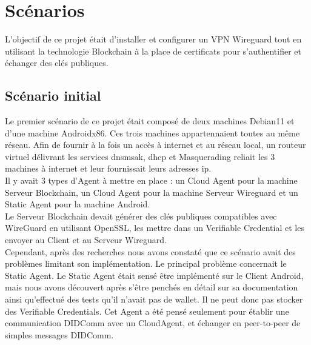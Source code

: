 \documentclass[12pt, openany]{report}
\begin{document}
\section{Scénarios}
L'objectif de ce projet était d'installer et configurer un VPN Wireguard tout en utilisant la technologie Blockchain à la place de certificats pour s'authentifier et échanger des clés publiques. 

\subsection{Scénario initial}
\noindent 
\begin{flushleft}
Le premier scénario de ce projet était composé de deux machines Debian11 et d'une machine Androidx86. Ces trois machines appartennaient toutes au même réseau. Afin de fournir à la fois un accès à internet et au réseau local, un routeur virtuel délivrant les services dnsmsak, dhcp et Masquerading reliait les 3 machines à internet et leur fournissait leurs adresses ip.\\
\vspace{2mm}
Il y avait 3 types d'Agent à mettre en place : un Cloud Agent pour la machine Serveur Blockchain, un Cloud Agent pour la machine Serveur Wireguard et un Static Agent pour la machine Android. \\
Le Serveur Blockchain devait générer des clés publiques compatibles avec WireGuard en utilisant OpenSSL, les mettre dans un Verifiable Credential et les envoyer au Client et au Serveur Wireguard. \\
Cependant, après des recherches nous avons constaté que ce scénario avait des problèmes limitant son implémentation. Le principal problème concernait le Static Agent. Le Static Agent était sensé être implémenté sur le Client Android, mais nous avons découvert après s'être penchés en détail sur sa documentation ainsi qu'effectué des tests qu'il n'avait pas de wallet. Il ne peut donc pas stocker des Verifiable Credentials. Cet Agent a été pensé seulement pour établir une communication DIDComm avec un CloudAgent, et échanger en peer-to-peer de simples messages DIDComm.
\end{flushleft}
\end{document}
